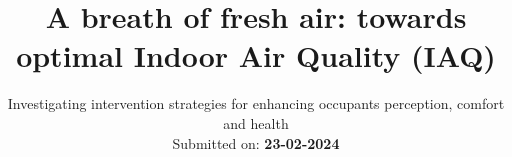 \title{A breath of fresh air: towards optimal Indoor Air Quality (IAQ)}
\subtitle{Investigating intervention strategies for enhancing occupants perception, comfort and health\\ Submitted on: \textbf{23-02-2024}}